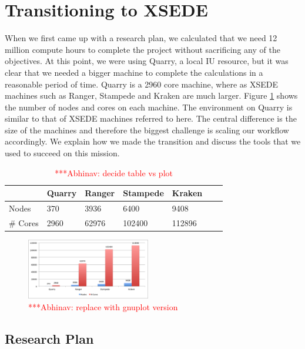 \documentclass{sig-alternate}
\newcommand{\abhi}[1]{ {\textcolor{red} { ***Abhinav: #1 }}}
\newcommand{\abhi}[1]{ {}}
\begin{document}
\section{Transitioning to XSEDE}\label{sec:resources}
When we first came up with a research plan, we calculated that we need 12 million compute hours to complete the project without sacrificing any of the objectives. At this point, we were using Quarry, a local IU resource, but it was clear that we needed a bigger machine to complete the calculations in a reasonable period of time. Quarry is a 2960 core machine, where as XSEDE machines such as Ranger, Stampede and Kraken are much larger. Figure \ref{fig:scaling} shows the number of nodes and cores on each machine. The environment on Quarry is similar to that of XSEDE machines referred to here. The central difference is the size of the machines and therefore the biggest challenge is scaling our workflow accordingly. We explain how we made the transition and discuss the tools that we used to succeed on this mission.
\begin{table}
\centering
\begin{tabular}{| l  | l  | l  | l  | l  | l  | l  |} \hline
	&Quarry & Ranger & Stampede & Kraken\\ \hline
Nodes & 370 & 3936 & 6400 & 9408   \\ \hline
\# Cores	& 2960  & 62976&102400 & 112896\\ 
\hline

\end{tabular}
\caption{\abhi{decide table vs plot}  } 
\label{table:cache_comp}
\end{table}


\begin{figure} %
\centering
\includegraphics[width=0.48\textwidth]{figures/cores-nodes.png}
\caption{\abhi{replace with gnuplot version}}
\label{fig:scaling}
\end{figure}

\subsection{Research Plan}\label{sec:plan}
\end{document}
